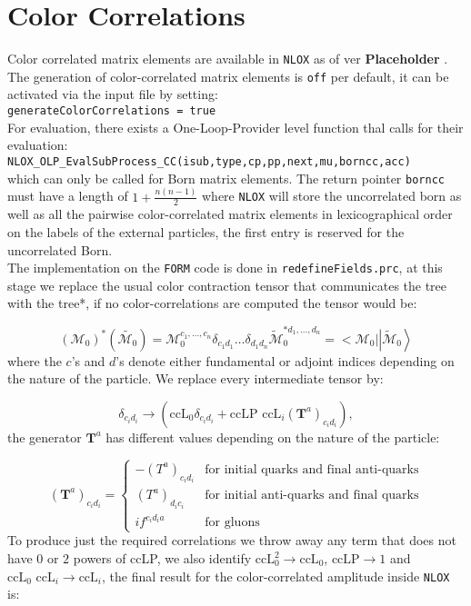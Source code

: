 \documentclass[a4paper]{article}
\def \NLOX{\texttt{NLOX} }
\def \Placeholder{ \textbf{Placeholder }}
\begin{document}
\newpage
\section{Color Correlations}
Color correlated matrix elements are available in \NLOX as of ver \Placeholder.
The generation of color-correlated matrix elements is \texttt{off} per default, 
it can be activated via the input file by setting:\\

  \texttt{generateColorCorrelations = true}\\

For evaluation, there exists a One-Loop-Provider level function thal calls for their evaluation:\\

  \texttt{NLOX\_OLP\_EvalSubProcess\_CC(isub,type,cp,pp,next,mu,borncc,acc)}\\
  
  
\noindent which can only be called for Born matrix elements. 
The return pointer \texttt{borncc} must have a length of $1+\frac{n(n-1)}{2}$ where \texttt{NLOX} will store 
the uncorrelated born as well as all the pairwise color-correlated matrix elements in lexicographical order on the labels of the external particles, the first entry is reserved for the uncorrelated Born.\\

The implementation on the \texttt{FORM} code is done in \texttt{redefineFields.prc}, at this stage 
we replace the usual color contraction tensor that communicates the tree with the tree*, if no 
color-correlations are computed the tensor would be:

\begin{equation}
 (\mathcal{M}_0)^*(\tilde{\mathcal{M}_0}) = 
 \mathcal{M}_0^{c_1,...,c_n}\delta_{c_1d_1}\dots\delta_{d_1d_n}\tilde{\mathcal{M}}_0^{*d_1,...,d_n} 
 = \Big<\mathcal{M}_0\Big|\left|\mathcal{\tilde M}_0\right>
\end{equation}
where the $c$'s and $d$'s denote either fundamental or adjoint indices depending on the nature 
of the particle. We replace every intermediate tensor by:

\begin{equation}
 \delta_{c_id_i}\rightarrow \left(\text{ccL}_0\delta_{c_id_i}+ \text{ccLP }\text{ccL}_i (\textbf{T}^a)_{c_id_i}\right),
\end{equation}
the generator $\textbf{T}^a$ has different values depending on the nature of the particle:

  \[ 
  (\textbf{T}^a)_{c_id_i} =
  \begin{cases} 
      -(T^a)_{c_id_i} & \text{for initial quarks and final anti-quarks} \\
      (T^a)_{d_ic_i} & \text{for initial anti-quarks and final quarks} \\
      if^{c_id_ia} & \text{for gluons} 
   \end{cases}
  \]
To produce just the required correlations we throw away any term that does not have $0$ or
$2$ powers of ccLP, we also identify $\text{ccL}_0^2\rightarrow \text{ccL}_0$, $\text{ccLP}\rightarrow 1$ and 
$\text{ccL}_0\text{ ccL}_i\rightarrow \text{ccL}_i$, the final result for the color-correlated amplitude inside \NLOX is:
\end{document}
